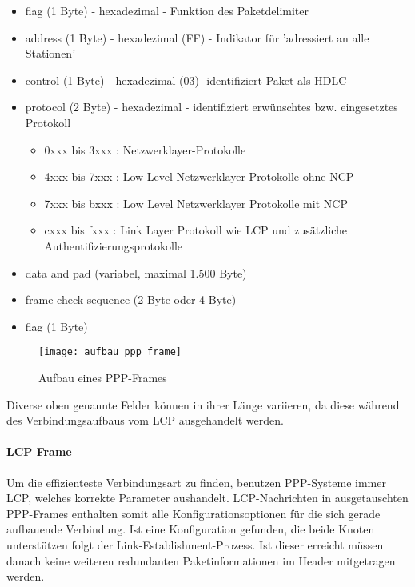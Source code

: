 \begin{itemize}
\item flag (1 Byte) - hexadezimal - Funktion des Paketdelimiter
\item address (1 Byte) - hexadezimal (FF) - Indikator für 'adressiert an alle Stationen'
\item control (1 Byte) - hexadezimal (03) -identifiziert Paket als \ac{HDLC}
\item protocol (2 Byte) - hexadezimal - identifiziert erwünschtes bzw. eingesetztes Protokoll
	\begin{itemize}
		\item 0xxx bis 3xxx : Netzwerklayer-Protokolle
		\item 4xxx bis 7xxx : Low Level Netzwerklayer Protokolle ohne \ac{NCP}
		\item 7xxx bis bxxx : Low Level Netzwerklayer Protokolle mit \ac{NCP}
		\item cxxx bis fxxx : Link Layer Protokoll wie LCP und zusätzliche Authentifizierungsprotokolle
	\end{itemize}
\item data and pad (variabel, maximal 1.500 Byte)
\item frame check sequence (2 Byte oder 4 Byte)
\item flag (1 Byte)
\end{itemize}

 \begin{figure}[htp]
  \begin{center}
   \texttt{[image: aufbau\_ppp\_frame]}
  \end{center}
  \caption[Aufbau eines PPP-Frames]{Aufbau eines PPP-Frames \cite{tcpipillustrated}}
  \label{abb:aufbau_ppp_frame}
 \end{figure}

Diverse oben genannte Felder können in ihrer Länge variieren, da 
diese während des Verbindungsaufbaus vom \ac{LCP} ausgehandelt werden.

\paragraph{LCP Frame} Um die effizienteste Verbindungsart zu finden, benutzen PPP-Systeme
immer \ac{LCP}, welches korrekte Parameter aushandelt. LCP-Nachrichten in ausgetauschten
PPP-Frames enthalten somit alle Konfigurationsoptionen für die sich gerade aufbauende
Verbindung. Ist eine Konfiguration gefunden, die beide Knoten unterstützen folgt der
Link-Establishment-Prozess. Ist dieser erreicht müssen danach keine weiteren redundanten
Paketinformationen im Header mitgetragen werden.

